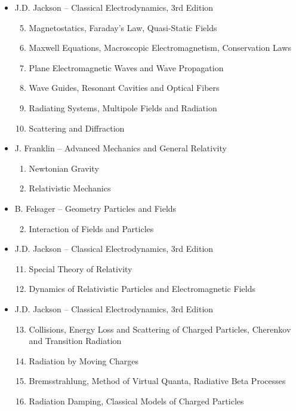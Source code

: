 \begin{itemize}
\item J.D. Jackson -- Classical Electrodynamics, 3rd Edition
\begin{enumerate}
\setcounter{enumi}{4}
\item Magnetostatics, Faraday's Law, Quasi-Static Fields
\item Maxwell Equations, Macroscopic Electromagnetism, Conservation Laws
\item Plane Electromagnetic Waves and Wave Propagation
\item Wave Guides, Resonant Cavities and Optical Fibers
\item Radiating Systems, Multipole Fields and Radiation
\item Scattering and Diffraction
\end{enumerate}


\item J. Franklin -- Advanced Mechanics and General Relativity
\begin{enumerate}
\setcounter{enumi}{0}
\item Newtonian Gravity
\item Relativistic Mechanics
\end{enumerate}

\item B. Felsager -- Geometry Particles and Fields
\begin{enumerate}
\setcounter{enumi}{1}
\item Interaction of Fields and Particles
\end{enumerate}

\item J.D. Jackson -- Classical Electrodynamics, 3rd Edition
\begin{enumerate}
\setcounter{enumi}{10}
\item Special Theory of Relativity
\item Dynamics of Relativistic Particles and Electromagnetic Fields
\end{enumerate}

\item J.D. Jackson -- Classical Electrodynamics, 3rd Edition
\begin{enumerate}
\setcounter{enumi}{12}
\item Collisions, Energy Loss and Scattering of Charged Particles, Cherenkov and Transition Radiation
\item Radiation by Moving Charges
\item Bremsstrahlung, Method of Virtual Quanta, Radiative Beta Processes
\item Radiation Damping, Classical Models of Charged Particles
\end{enumerate}


\end{itemize}
